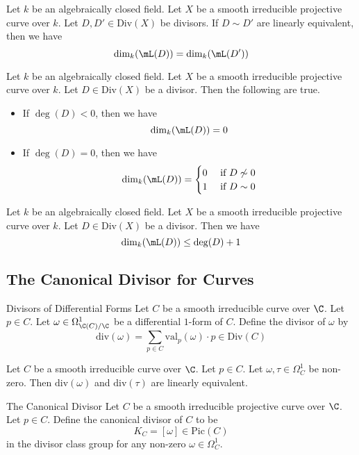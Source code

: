 \documentclass[a4paper]{article}
\begin{document}
\begin{prp}{}{} Let $k$ be an algebraically closed field. Let $X$ be a smooth irreducible projective curve over $k$. Let $D,D'\in\text{Div}(X)$ be divisors. If $D\sim D'$ are linearly equivalent, then we have $$\dim_k(\mL(D))=\dim_k(\mL(D'))$$
\end{prp}

\begin{prp}{}{} Let $k$ be an algebraically closed field. Let $X$ be a smooth irreducible projective curve over $k$. Let $D\in\text{Div}(X)$ be a divisor. Then the following are true. 
\begin{itemize}
\item If $\deg(D)<0$, then we have $$\dim_k(\mL(D))=0$$
\item If $\deg(D)=0$, then we have $$\dim_k(\mL(D))=\begin{cases}
0 & \text{ if }D\not\sim0\\
1 & \text{ if }D\sim 0
\end{cases}$$
\end{itemize}
\end{prp}

\begin{prp}{}{} Let $k$ be an algebraically closed field. Let $X$ be a smooth irreducible projective curve over $k$. Let $D\in\text{Div}(X)$ be a divisor. Then we have $$\dim_k(\mL(D))\leq\deg(D)+1$$
\end{prp}

\subsection{The Canonical Divisor for Curves}
\begin{defn}{Divisors of Differential Forms}{} Let $C$ be a smooth irreducible curve over $\C$. Let $p\in C$. Let $\omega\in\Omega_{\C(C)/\C}^1$ be a differential $1$-form of $C$. Define the divisor of $\omega$ by $$\text{div}(\omega)=\sum_{p\in C}\text{val}_p(\omega)\cdot p\in\text{Div}(C)$$
\end{defn}

\begin{prp}{}{} Let $C$ be a smooth irreducible curve over $\C$. Let $p\in C$. Let $\omega,\tau\in\Omega_C^1$ be non-zero. Then $\text{div}(\omega)$ and $\text{div}(\tau)$ are linearly equivalent. 
\end{prp}

\begin{defn}{The Canonical Divisor}{} Let $C$ be a smooth irreducible projective curve over $\C$. Let $p\in C$. Define the canonical divisor of $C$ to be $$K_C=[\omega]\in\text{Pic}(C)$$ in the divisor class group for any non-zero $\omega\in\Omega_C^1$. 
\end{defn}
\end{document}
